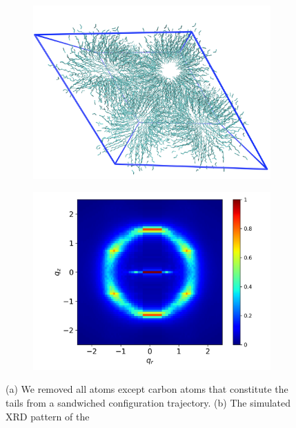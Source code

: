 \documentclass{article}
\begin{document}
  \begin{figure}
	\centering
	\begin{subfigure}{0.45\linewidth}
		\centering
	 	\vspace{-2em}
		\includegraphics[width=\textwidth]{tails_topview.png}  %
		\caption{}\label{fig:topdown_tails_only}
	\end{subfigure}
	\begin{subfigure}{0.45\linewidth}
		\centering
		\includegraphics[width=\textwidth]{tails_rzplot.png}
		\caption{}\label{fig:tails_rzplot}
	\end{subfigure}
	\caption{(a) We removed all atoms except carbon atoms that constitute the tails from a 
	sandwiched configuration trajectory. (b) The simulated XRD pattern of the
}
\end{figure}
\end{document}
